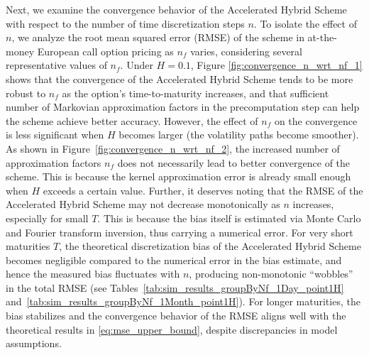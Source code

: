 \documentclass[11pt]{article}%
\theoremstyle{definition}
\begin{document}
Next, we examine the convergence behavior of the Accelerated Hybrid Scheme with respect to the number of time discretization steps \(n\). To isolate the effect of \(n\), we analyze the root mean squared error (RMSE) of the scheme in at-the-money European call option pricing as \(n_f\) varies, considering several representative values of \(n_f\). Under \(H = 0.1\), Figure \ref{fig:convergence_n_wrt_nf_1} shows that the convergence of the Accelerated Hybrid Scheme tends to be more robust to \(n_f\) as the option's time-to-maturity increases, and that sufficient number of Markovian approximation factors in the precomputation step can help the scheme achieve better accuracy. However, the effect of \(n_f\) on the convergence is less significant when \(H\) becomes larger (the volatility paths become smoother). As shown in Figure~\ref{fig:convergence_n_wrt_nf_2}, the increased number of approximation factors \(n_f\) does not necessarily lead to better convergence of the scheme. This is because the kernel approximation error is already small enough when \(H\) exceeds a certain value. Further, it deserves noting that the RMSE of the Accelerated Hybrid Scheme may not decrease monotonically as \(n\) increases, especially for small \(T\). 
This is because the bias itself is estimated via Monte Carlo and Fourier transform inversion, thus carrying a numerical error. For very short maturities \(T\), the theoretical discretization bias of the Accelerated Hybrid Scheme becomes negligible compared to the numerical error in the bias estimate, and hence the measured bias fluctuates with \(n\), producing non-monotonic ``wobbles'' in the total RMSE (see Tables~\ref{tab:sim_results_groupByNf_1Day_point1H} and~\ref{tab:sim_results_groupByNf_1Month_point1H}). For longer maturities, the bias stabilizes and the convergence behavior of the RMSE aligns well with the theoretical results in \eqref{eq:mse_upper_bound}, despite discrepancies in model assumptions.
\end{document}
